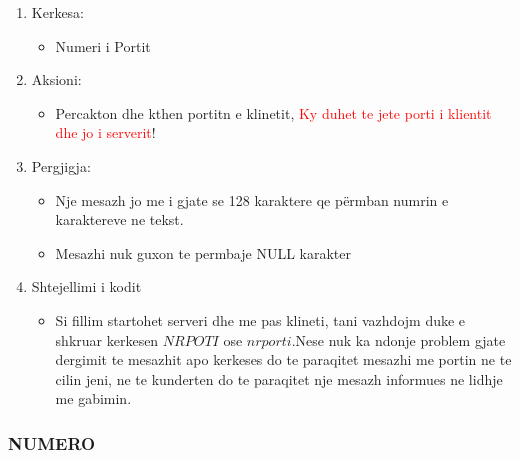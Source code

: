 \documentclass[]{article}
\begin{document}
\begin{enumerate}
\item Kerkesa:
\begin{itemize}
\item Numeri i Portit
\end{itemize}
\item Aksioni:
\begin{itemize}
\item Percakton dhe kthen portitn e klinetit, \textcolor{red}{Ky duhet te jete porti i klientit dhe jo i serverit}!
\end{itemize} 
\item Pergjigja:
\begin{itemize}
\item Nje mesazh jo me i gjate se 128 karaktere qe përmban numrin e karaktereve ne tekst.
\item  Mesazhi nuk guxon te permbaje NULL karakter

\end{itemize}
\item Shtejellimi i kodit
\begin{itemize}
\item Si fillim startohet serveri dhe me pas klineti, tani vazhdojm duke e shkruar kerkesen $NRPOTI$ ose $nrporti$.Nese nuk ka ndonje problem gjate dergimit te mesazhit apo kerkeses do te paraqitet mesazhi me portin ne te cilin jeni, ne te kunderten do te paraqitet nje mesazh informues ne lidhje me gabimin.
\end{itemize}
\end{enumerate}
\newpage
\subsubsection{NUMERO}
\end{document}
